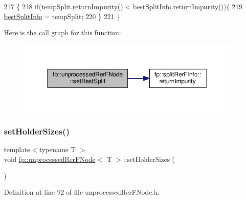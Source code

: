 \begin{DoxyCode}
217                                                                     \{
218                     \textcolor{keywordflow}{if}(tempSplit.returnImpurity() < \hyperlink{classfp_1_1unprocessedRerFNode_acf98051b30cb1c0f2e62bb7df51c0884}{bestSplitInfo}.returnImpurity())\{
219                         \hyperlink{classfp_1_1unprocessedRerFNode_acf98051b30cb1c0f2e62bb7df51c0884}{bestSplitInfo} = tempSplit;
220                     \}
221                 \}
\end{DoxyCode}
Here is the call graph for this function\+:
\nopagebreak
\begin{figure}[H]
\begin{center}
\leavevmode
\includegraphics[width=340pt]{classfp_1_1unprocessedRerFNode_ac31049fede0262a8879905802884fe6f_cgraph}
\end{center}
\end{figure}
\mbox{\label{classfp_1_1unprocessedRerFNode_a0fccfed626582cf730f6302fc2f703c4}} 
\subsubsection{\texorpdfstring{set\+Holder\+Sizes()}{setHolderSizes()}}
{\footnotesize\ttfamily template$<$typename T $>$ \\
void \hyperlink{classfp_1_1unprocessedRerFNode}{fp\+::unprocessed\+Rer\+F\+Node}$<$ T $>$\+::set\+Holder\+Sizes (\begin{DoxyParamCaption}{ }\end{DoxyParamCaption})\hspace{0.3cm}{\ttfamily [inline]}}



Definition at line 92 of file unprocessed\+Rer\+F\+Node.\+h.


